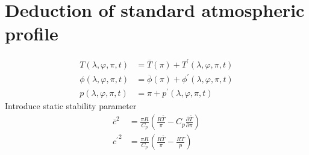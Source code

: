 \documentclass[12pt]{article}
\numberwithin{equation}{section}
\newcommand{\pd}[2]{\frac{\partial #1}{\partial #2}}
\newcommand{\x}{\lambda}
\newcommand{\y}{\varphi}
\begin{document}


\pagebreak
\section{Deduction of standard atmospheric profile}

\begin{align*}
      T\left(\x, \y, \pi, t\right) & = \overline{T}   \left(\pi\right) +    T^\prime\left(\x, \y, \pi, t\right) \\
   \phi\left(\x, \y, \pi, t\right) & = \overline{\phi}\left(\pi\right) + \phi^\prime\left(\x, \y, \pi, t\right) \\
      p\left(\x, \y, \pi, t\right) & =                             \pi +    p^\prime\left(\x, \y, \pi, t\right)
\end{align*}
Introduce static stability parameter
\begin{align}
  \overline{c}^2 & = \frac{\pi R}{C_p} \left(\frac{R \overline{T}}{\pi} - C_p \pd{\overline{T}}{\pi} \right) \\
  {c^\prime}^2 & = \frac{\pi R}{C_p}  \left(\frac{R \overline{T}}{\pi} - \frac{R T}{p}\right)
\end{align}
\end{document}
